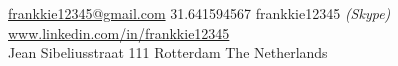 \documentclass[10pt,a4paper]{article}
\begin{document}
\sloppy  %


\nobreakvspace{0.3em}  %

\noindent\href{mailto:frankkie12345@gmail.com}{frankkie12345\mbox{}@\mbox{}gmail.com}\sbull
\textsmaller{+}31.641594567\sbull
frankkie12345 \emph{(Skype)}\sbull
\href{http://www.linkedin.com/in/frankkie12345}{www.linkedin.com/in/frankkie12345}
\\
Jean Sibeliusstraat 111\sbull
Rotterdam\sbull
The Netherlands

\spacedhrule{0.9em}{-0.4em}  %

\end{document}
